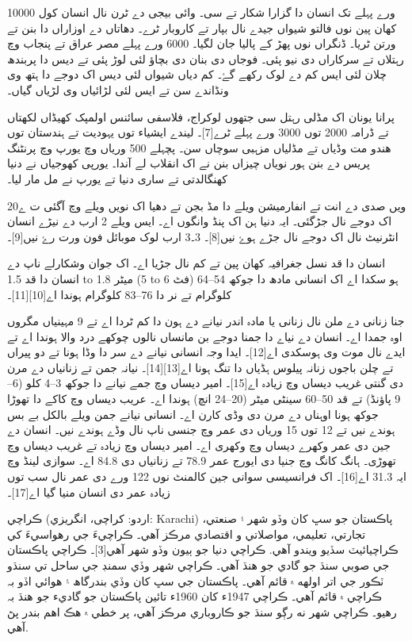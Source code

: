 \documentclass[a4paper]{article}
\begin{document}
10000 ورے پہلے تک انسان دا گزارا شکار تے سی۔ وائی بیجی دے ٹرن نال انسان کول کھان پین نوں فالتو شیواں جیدے نال بپار تے کاروبار ٹرے۔ دھاتاں دے اوزاراں دا بنن تے ورتن ٹریا۔ ڈنگراں نوں پھڑ کے پالیا جان لگیا۔ 6000 ورے پہلے مصر عراق تے پنجاب وچ رہتلاں تے سرکاراں دی نیو پئی۔ فوجاں دی بنان دی بچاؤ لئی لوڑ پئی تے دیس دا پربندھ چلان لئی ایس کم دے لوک رکھے گۓ۔ کم دیاں شیواں لئی دیس اک دوجے دا ہتھ وی ونڈاندے سن تے ایس لئی لڑائیاں وی لڑیاں گیاں۔



پرانا یونان اک مڈلی رہتل سی جتھوں لوکراج، فلاسفی سائنس اولمپک کھیڈاں لکھتاں تے ڈرامہ 2000 توں 3000 ورے پہلے ٹرے[7]۔ لیندے ایشیاء توں یہودیت تے ہندستان توں ھندو مت وڈیاں تے مڈلیاں مزہبی سوچاں سن۔ پچہلے 500 وریاں وچ یورپ وچ پرنٹنگ پریس دے بنن ہور نویاں چیزاں بنن نے اک انقلاب لے آندا۔ یورپی کھوجیاں نے دنیا کھنگالدتی تے ساری دنیا تے یورپ نے مل مار لیا۔



20ویں صدی دے انت تے انفارمیشن ویلے دا مڈ بجن تے دھیا اک نویں ویلے وچ آگئی ت ے اک دوجے نال جڑگئی۔ ایہ دنیا ہن اک پنڈ وانگوں اے۔ ایس ویلے 2 ارب دے نیڑے انسان انٹرنیٹ نال اک دوجے نال جڑے ہوۓ نیں[8]۔ 3۔3 ارب لوک موبائل فون ورت رۓ نیں[9]۔

انسان دا قد نسل جغرافیہ کھان پین تے کم نال جڑیا اے۔ اک جوان وشکارلے ناپ دے انسان دا قد 1.5 to 1.8 میٹر (5 to 6 فٹ) ہو سکدا اے اک انسانی مادھ دا جوکھ 54–64 کلوگرام تے نر دا 76–83 کلوگرام ہوندا اے[10][11]۔



جنا زنانی دے ملن نال زنانی یا مادہ اندر نیانے دے ہون دا کم ٹردا اے تے 9 مہینیاں مگروں اوہ جمدا اے۔ انسان دے نیاے دا جمنا دوجے بن مانساں نالوں چوکھے درد والا ہوندا اے تے ایدے نال موت وی ہوسکدی اے[12]۔ ایدا وجہ انسانی نیانے دے سر دا وڈا ہونا تے دو پیراں تے چلن باجوں زنانہ پیلوس ہڈیاں دا تنگ ہونا اے[13][14]۔ نیانہ جمن تے زنانیاں دے مرن دی گنتی غریب دیساں وچ زیادہ اے[15]۔ امیر دیساں وچ جمے نیانے دا جوکھ 3–4 کلو (6–9 پاؤنڈ) تے قد 50–60 سینٹی میٹر (20–24 انچ) ہوندا اے۔ عریب دیساں وچ کاکے دا تھوڑا جوکھ ہونا اوہناں دے مرن دی وڈی کارن اے۔ انسانی نیانے جمن ویلے بالکل بے بس ہوندے نیں تے 12 توں 15 وریاں دی عمر وچ جنسی ناپ نال وڈے ہوندے نیں۔ انسان دے جین دی عمر وکھرے دیساں وچ وکھری اے۔ امیر دیساں وچ زیادہ تے غریب دیساں وچ تھوڑی۔ ہانگ کانگ وچ جنیا دی ایورج عمر 78.9 تے زنانیاں دی 84.8 اے۔ سوازی لینڈ وچ ایہ 31.3 اے[16]۔ اک فرانسیسی سوانی جین کالمنٹ نوں 122 ورے دی عمر نال سب توں زیادہ عمر دی انسان منیا گیا اے[17]۔

ڪراچي (اردو: کراچی، انگريزي: Karachi) پاڪستان جو سڀ کان وڏو شھر ۽ صنعتي، تجارتي، تعليمي، مواصلاتي و اقتصادي مرڪز آھي۔ ڪراچيءَ جي رهواسيءَ کي ڪراچيائيٽ سڏيو ويندو آهي. ڪراچي دنيا جو ٻيون وڏو شھر آھي[3]۔ ڪراچي پاڪستان جي صوبي سنڌ جو گادي جو ھنڌ آھي۔ ڪراچي شهر وڏي سمنڊ جي ساحل تي سنڌو ٽڪور جي اتر اولهه ۾ قائم آهي۔ پاڪستان جي سڀ کان وڏي بندرگاھ ۽ ھوائي اڏو بہ ڪراچي ۾ قائم آھي۔ ڪراچي 1947ء کان 1960ء تائين پاڪستان جو گاديء جو ھنڌ بہ رھيو۔ ڪراچي شهر نه رڳو سنڌ جو ڪاروباري مرڪز آهي، پر خطي ۾ هڪ اهم بندر پڻ آهي.
\end{document}
